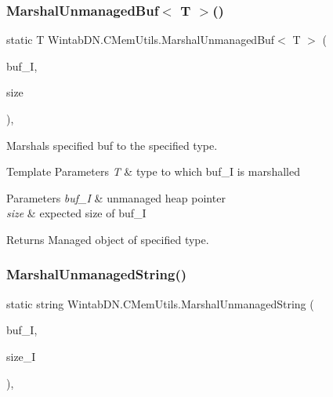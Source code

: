 \subsubsection{\texorpdfstring{Marshal\+Unmanaged\+Buf$<$ T $>$()}{MarshalUnmanagedBuf< T >()}}
{\footnotesize\ttfamily static T Wintab\+D\+N.\+C\+Mem\+Utils.\+Marshal\+Unmanaged\+Buf$<$ T $>$ (\begin{DoxyParamCaption}\item[{Int\+Ptr}]{buf\+\_\+I,  }\item[{int}]{size }\end{DoxyParamCaption})\hspace{0.3cm}{\ttfamily [inline]}, {\ttfamily [static]}}



Marshals specified buf to the specified type. 


\begin{DoxyTemplParams}{Template Parameters}
{\em T} & type to which buf\+\_\+I is marshalled\\
\hline
\end{DoxyTemplParams}

\begin{DoxyParams}{Parameters}
{\em buf\+\_\+I} & unmanaged heap pointer\\
\hline
{\em size} & expected size of buf\+\_\+I\\
\hline
\end{DoxyParams}
\begin{DoxyReturn}{Returns}
Managed object of specified type.
\end{DoxyReturn}
\mbox{\label{class_wintab_d_n_1_1_c_mem_utils_a6d38c832a884e4bc72ec906d7be29c1f}} 
\subsubsection{\texorpdfstring{Marshal\+Unmanaged\+String()}{MarshalUnmanagedString()}}
{\footnotesize\ttfamily static string Wintab\+D\+N.\+C\+Mem\+Utils.\+Marshal\+Unmanaged\+String (\begin{DoxyParamCaption}\item[{Int\+Ptr}]{buf\+\_\+I,  }\item[{int}]{size\+\_\+I }\end{DoxyParamCaption})\hspace{0.3cm}{\ttfamily [inline]}, {\ttfamily [static]}}



